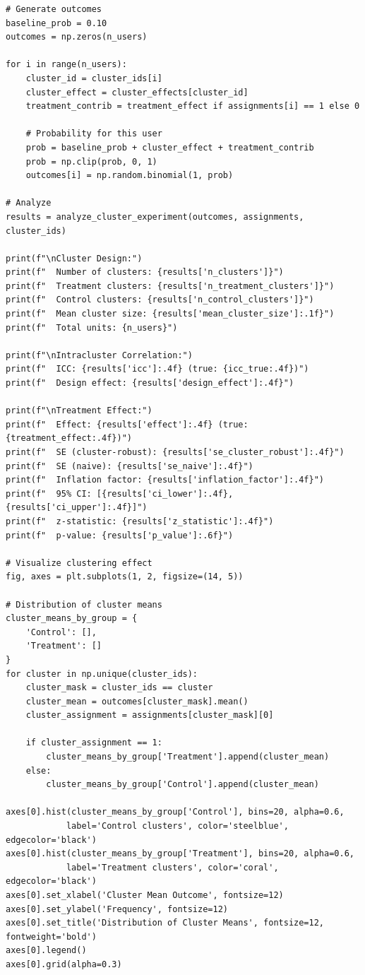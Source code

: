 \begin{lstlisting}
# Generate outcomes
baseline_prob = 0.10
outcomes = np.zeros(n_users)

for i in range(n_users):
    cluster_id = cluster_ids[i]
    cluster_effect = cluster_effects[cluster_id]
    treatment_contrib = treatment_effect if assignments[i] == 1 else 0

    # Probability for this user
    prob = baseline_prob + cluster_effect + treatment_contrib
    prob = np.clip(prob, 0, 1)
    outcomes[i] = np.random.binomial(1, prob)

# Analyze
results = analyze_cluster_experiment(outcomes, assignments, cluster_ids)

print(f"\nCluster Design:")
print(f"  Number of clusters: {results['n_clusters']}")
print(f"  Treatment clusters: {results['n_treatment_clusters']}")
print(f"  Control clusters: {results['n_control_clusters']}")
print(f"  Mean cluster size: {results['mean_cluster_size']:.1f}")
print(f"  Total units: {n_users}")

print(f"\nIntracluster Correlation:")
print(f"  ICC: {results['icc']:.4f} (true: {icc_true:.4f})")
print(f"  Design effect: {results['design_effect']:.4f}")

print(f"\nTreatment Effect:")
print(f"  Effect: {results['effect']:.4f} (true: {treatment_effect:.4f})")
print(f"  SE (cluster-robust): {results['se_cluster_robust']:.4f}")
print(f"  SE (naive): {results['se_naive']:.4f}")
print(f"  Inflation factor: {results['inflation_factor']:.4f}")
print(f"  95% CI: [{results['ci_lower']:.4f}, {results['ci_upper']:.4f}]")
print(f"  z-statistic: {results['z_statistic']:.4f}")
print(f"  p-value: {results['p_value']:.6f}")

# Visualize clustering effect
fig, axes = plt.subplots(1, 2, figsize=(14, 5))

# Distribution of cluster means
cluster_means_by_group = {
    'Control': [],
    'Treatment': []
}
for cluster in np.unique(cluster_ids):
    cluster_mask = cluster_ids == cluster
    cluster_mean = outcomes[cluster_mask].mean()
    cluster_assignment = assignments[cluster_mask][0]

    if cluster_assignment == 1:
        cluster_means_by_group['Treatment'].append(cluster_mean)
    else:
        cluster_means_by_group['Control'].append(cluster_mean)

axes[0].hist(cluster_means_by_group['Control'], bins=20, alpha=0.6,
            label='Control clusters', color='steelblue', edgecolor='black')
axes[0].hist(cluster_means_by_group['Treatment'], bins=20, alpha=0.6,
            label='Treatment clusters', color='coral', edgecolor='black')
axes[0].set_xlabel('Cluster Mean Outcome', fontsize=12)
axes[0].set_ylabel('Frequency', fontsize=12)
axes[0].set_title('Distribution of Cluster Means', fontsize=12, fontweight='bold')
axes[0].legend()
axes[0].grid(alpha=0.3)


\end{lstlisting}
